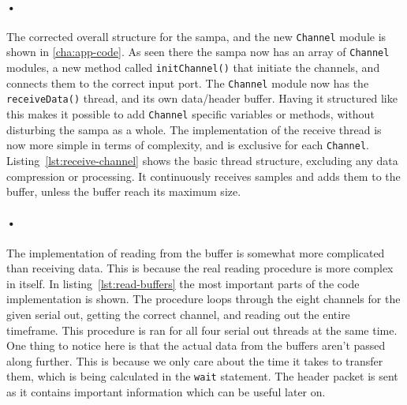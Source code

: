 \documentclass[a4paper, 12pt]{report}
\newcommand{\codeword}[1]{\texttt{#1}}
\begin{document}
\begin{minipage}{\linewidth}

\end{minipage}

\paragraph{•}
The corrected overall structure for the \gls{sampa}, and the new \codeword{Channel} module is shown in \ref{cha:app-code}.
As seen there the \gls{sampa} now has an array of \codeword{Channel} modules, a new method called \codeword{initChannel()} that initiate the channels, and connects them to the correct input port.
The \codeword{Channel} module now has the \codeword{receiveData()} thread, and its own data/header buffer.
Having it structured like this makes it possible to add \codeword{Channel} specific variables or methods, without disturbing the \gls{sampa} as a whole.
The implementation of the receive thread is now more simple in terms of complexity, and is exclusive for each \codeword{Channel}.
Listing~\ref{lst:receive-channel} shows the basic thread structure, excluding any data compression or processing.
It continuously receives samples and adds them to the buffer, unless the buffer reach its maximum size.

\begin{minipage}{\linewidth}

\end{minipage}

\paragraph{•}
The implementation of reading from the buffer is somewhat more complicated than receiving data.
This is because the real reading procedure is more complex in itself.
In listing~\ref{lst:read-buffers} the most important parts of the code implementation is shown.
The procedure loops through the eight channels for the given serial out, getting the correct channel, and reading out the entire timeframe.
This procedure is ran for all four serial out threads at the same time.
One thing to notice here is that the actual data from the buffers aren't passed along further.
This is because we only care about the time it takes to transfer them, which is being calculated in the \codeword{wait} statement.
The header packet is sent as it contains important information which can be useful later on.
\end{document}
